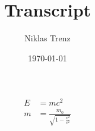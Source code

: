 \documentclass[a4paper,12pt]{article}
\title{Transcript}
\author{Niklas Trenz}
\date{\today}
\begin{document}
    \maketitle
    \tableofcontents

    


    \begin{align}
        E &= mc^2                   \\
        m &= \frac{m_0}{\sqrt{1-\frac{v^2}{c^2}}}
    \end{align}
\end{document}
